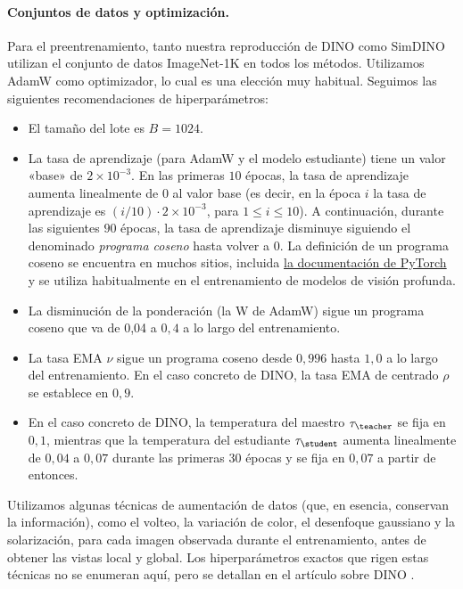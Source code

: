 \documentclass[../../book-main_es.tex]{subfiles}
\begin{document}
\paragraph{Conjuntos de datos y optimización.} Para el preentrenamiento, tanto nuestra
reproducción de DINO como SimDINO utilizan el conjunto de datos ImageNet-1K en todos los
métodos. Utilizamos AdamW \citep{Loshchilov2017DecoupledWD} como
optimizador, lo cual es una elección muy habitual. Seguimos las siguientes
recomendaciones de hiperparámetros:
\begin{itemize}
\item El tamaño del lote es \(B = 1024\).
\item La tasa de aprendizaje (para AdamW y el modelo estudiante) tiene
    un valor «base» de \(2 \times 10^{-3}\). En las primeras \(10\) épocas,
    la tasa de aprendizaje aumenta linealmente de \(0\) al valor base
    (es decir, en la época \(i\) la tasa de aprendizaje es \((i/10) \cdot 2
    \times 10^{-3}\), para \(1 \leq i \leq 10\)). A continuación, durante las siguientes
    \(90\) épocas, la tasa de aprendizaje disminuye siguiendo el denominado
    \textit{programa coseno} hasta volver a \(0\). La definición de un
    programa coseno se encuentra en muchos sitios, incluida
    \href{https://pytorch.org/docs/stable/generated/torch.optim.lr_scheduler.CosineAnnealingLR.html}{la documentación de PyTorch} 
    y se utiliza habitualmente en el entrenamiento de modelos de visión profunda.
\item La disminución de la ponderación (la W de AdamW) sigue un programa coseno
    que va de 0,04 a \(0,4\) a lo largo del entrenamiento.
\item La tasa EMA \(\nu\) sigue un programa coseno desde \(0,996\)
    hasta \(1,0\) a lo largo del entrenamiento. En el caso concreto de DINO, la tasa EMA de centrado
    \(\rho\) se establece en \(0,9\).
\item En el caso concreto de DINO, la temperatura del maestro
    \(\tau_{\teacher}\) se fija en \(0,1\), mientras que la temperatura del estudiante
    \(\tau_{\student}\) aumenta linealmente de \(0,04\)
    a \(0,07\) durante las primeras \(30\) épocas y se fija en
    \(0,07\) a partir de entonces.
\end{itemize}
Utilizamos algunas técnicas de aumentación de datos (que, en esencia, conservan la información),
como el volteo, la variación de color, el desenfoque gaussiano y la solarización, para
cada imagen observada durante el entrenamiento, antes de obtener las vistas local y global.
Los hiperparámetros exactos que rigen estas técnicas no se enumeran aquí,
pero se detallan en el artículo sobre DINO \citep{caron2021emerging}.
\end{document}

